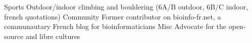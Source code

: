 
\begin{cvskills}

\cvskill
    {Sports} %
    {Outdoor/indoor climbing and bouldering (6A/B outdoor, 6B/C indoor, french quotations)} %
\cvskill
    {Community} %
    {Former contributor on bioinfo-fr.net, a communautary French blog for bioinformaticians} %
\cvskill
    {Misc} %
    {Advocate for the open-source and libre cultures} %

\end{cvskills}